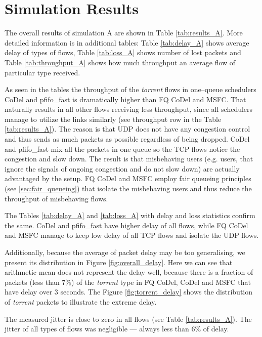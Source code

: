 \section{Simulation Results}

 

The overall results of simulation A are shown in Table \ref{tab:results_A}. More detailed information is in additional tables: Table \ref{tab:delay_A} shows average delay of types of flows, Table \ref{tab:loss_A} shows number of lost packets and Table \ref{tab:throughput_A} shows how much throughput an average flow of particular type received.

As seen in the tables the throughput of the \emph{torrent} flows in one--queue schedulers CoDel and pfifo\_fast is dramatically higher than FQ CoDel and MSFC. That naturally results in all other flows receiving less throughput, since all schedulers manage to utilize the links similarly (see throughput row in the Table \ref{tab:results_A}). The reason is that UDP does not have any congestion control and thus sends as much packets as possible regardless of being dropped. CoDel and pfifo\_fast mix all the packets in one queue so the TCP flows notice the congestion and slow down. The result is that misbehaving users (e.g. users, that ignore the signals of ongoing congestion and do not slow down) are actually advantaged by the setup. FQ CoDel and MSFC employ fair queueing principles (see \autoref{sec:fair_queueing}) that isolate the misbehaving users and thus reduce the throughput of misbehaving flows.

The Tables \ref{tab:delay_A} and \ref{tab:loss_A} with delay and loss statistics confirm the same. CoDel and pfifo\_fast have higher delay of all flows, while FQ CoDel and MSFC manage to keep low delay of all TCP flows and isolate the UDP flows. 

Additionally, because the average of packet delay may be too generalising, we present its distribution in Figure \ref{fig:overall_delay}. Here we can see that arithmetic mean does not represent the delay well, because there is a fraction of packets (less than 7\%) of the \emph{torrent} type in FQ CoDel, CoDel and MSFC that have delay over 3 seconds. The Figure \ref{fig:torrent_delay} shows the distribution of \emph{torrent} packets to illustrate the extreme delay.

The measured jitter is close to zero in all flows (see Table \ref{tab:results_A}). The jitter of all types of flows was negligible --- always less than 6\% of delay.

